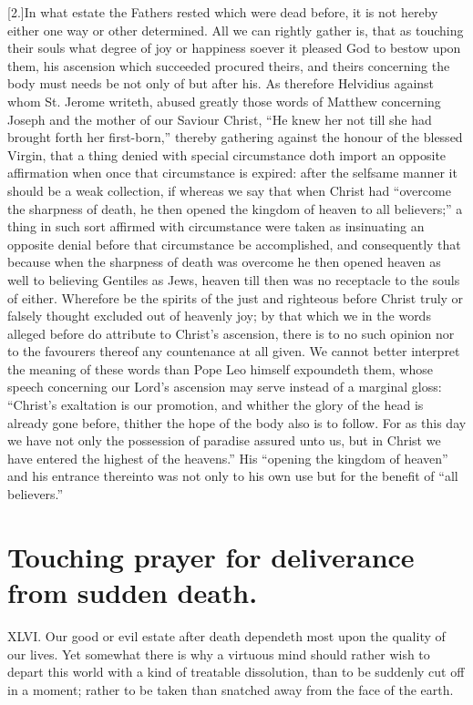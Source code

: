 [2.]In what estate the Fathers rested which were dead before, it is not hereby either one way or other determined. All we can rightly gather is, that as touching their souls what degree of joy or happiness soever it pleased God to bestow upon them, his ascension which succeeded procured theirs, and theirs concerning the body must needs be not only of but after his. As therefore Helvidius against whom St. Jerome writeth, abused greatly those words of Matthew concerning Joseph and the mother of our Saviour Christ, “He knew her not till she had brought forth her first-born,” thereby gathering against the honour of the blessed Virgin, that a thing denied with special circumstance doth import an opposite affirmation when once that circumstance is expired: after the selfsame manner it should be a weak collection, if whereas we say that when Christ had “overcome the sharpness of death, he then opened the kingdom of heaven to all believers;” a thing in such sort affirmed with circumstance were taken as insinuating an opposite denial before that circumstance be accomplished, and consequently that because when the sharpness of death was overcome he then opened heaven as well to believing Gentiles as Jews, heaven till then was no receptacle to the souls of either. Wherefore be the spirits of the just and righteous before Christ truly or falsely thought excluded out of heavenly joy; by that which we in the words alleged before do attribute to Christ’s ascension, there is to no such opinion nor to the favourers thereof any  countenance at all given.
 We cannot better interpret the meaning of these words than Pope Leo himself expoundeth them, whose speech concerning our Lord’s ascension may serve instead of a marginal gloss: “Christ’s exaltation is our promotion, and whither the glory of the head is already gone before, thither the hope of the body also is to follow. For as this day we have not only the possession of paradise assured unto us, but in Christ we have entered the highest of the heavens.” His “opening the kingdom of heaven” and his entrance thereinto was not only to his own use but for the benefit of “all believers.”


\section*{Touching prayer for deliverance from sudden death.}
XLVI. Our good or evil estate after death dependeth most upon the quality of our lives. Yet somewhat there is why a virtuous mind should rather wish to depart this world with a kind of treatable dissolution, than to be suddenly cut off in a moment; rather to be taken than snatched away from the face of the earth.


